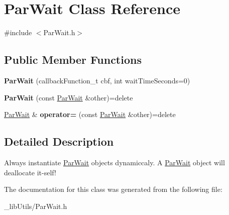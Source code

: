 \hypertarget{class_par_wait}{}\section{Par\+Wait Class Reference}
\label{class_par_wait}


{\ttfamily \#include $<$Par\+Wait.\+h$>$}

\subsection*{Public Member Functions}
\begin{DoxyCompactItemize}
\item 
\mbox{\label{class_par_wait_ab369159efc089a70d7be3b5c7cb12d74}} 
{\bfseries Par\+Wait} (callback\+Function\+\_\+t cbf, int wait\+Time\+Seconds=0)
\item 
\mbox{\label{class_par_wait_a63da26de5c61e94edf72df63b85bb577}} 
{\bfseries Par\+Wait} (const \mbox{\hyperlink{class_par_wait}{Par\+Wait}} \&other)=delete
\item 
\mbox{\label{class_par_wait_aaf6876b1f496bc44eb7f305aac839e5d}} 
\mbox{\hyperlink{class_par_wait}{Par\+Wait}} \& {\bfseries operator=} (const \mbox{\hyperlink{class_par_wait}{Par\+Wait}} \&other)=delete
\end{DoxyCompactItemize}


\subsection{Detailed Description}
Always instantiate \mbox{\hyperlink{class_par_wait}{Par\+Wait}} objects dynamiccaly. A \mbox{\hyperlink{class_par_wait}{Par\+Wait}} object will deallocate it-\/self! 

The documentation for this class was generated from the following file\+:\begin{DoxyCompactItemize}
\item 
\+\_\+lib\+Utils/Par\+Wait.\+h\end{DoxyCompactItemize}
